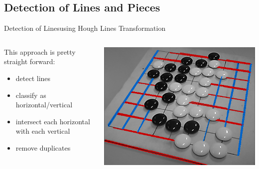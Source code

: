 \documentclass[table]{beamer}
\begin{document}
\subsection{Detection of Lines and Pieces}
\begin{frame}{Detection of Lines}{using Hough Lines Transformation}
	\begin{columns}
		\begin{column}{0.5\textwidth}
			This approach is pretty straight forward:
			\begin{itemize}
				\item detect lines
				\item classify as horizontal/vertical
				\item intersect each horizontal with each vertical
				\item remove duplicates
			\end{itemize}
		\end{column}

		\begin{column}{0.45\textwidth}
			\includegraphics[width=\columnwidth]{images/lineDetection_hough.png}
		\end{column}
	\end{columns}
\end{frame}
\end{document}
